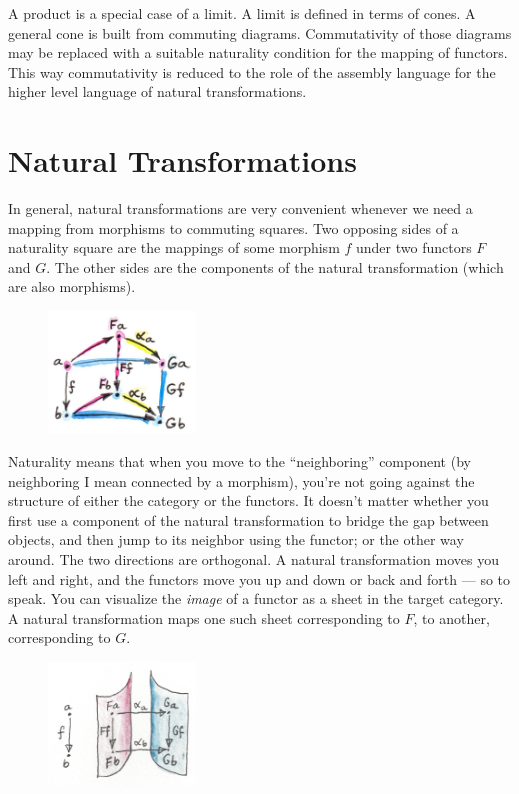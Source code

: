 \noindent
A product is a special case of a limit. A limit is defined in terms of
cones. A general cone is built from commuting diagrams. Commutativity of
those diagrams may be replaced with a suitable naturality condition for
the mapping of functors. This way commutativity is reduced to the role
of the assembly language for the higher level language of natural
transformations.

\section{Natural Transformations}

In general, natural transformations are very convenient whenever we need
a mapping from morphisms to commuting squares. Two opposing sides of a
naturality square are the mappings of some morphism $f$ under two
functors $F$ and $G$. The other sides are the components
of the natural transformation (which are also morphisms).

\begin{figure}[H]
  \centering
  \includegraphics[width=0.35\textwidth]{images/3_naturality.jpg}
\end{figure}

\noindent
Naturality means that when you move to the ``neighboring'' component (by
neighboring I mean connected by a morphism), you're not going against
the structure of either the category or the functors. It doesn't matter
whether you first use a component of the natural transformation to
bridge the gap between objects, and then jump to its neighbor using the
functor; or the other way around. The two directions are orthogonal. A
natural transformation moves you left and right, and the functors move
you up and down or back and forth --- so to speak. You can visualize the
\emph{image} of a functor as a sheet in the target category. A natural
transformation maps one such sheet corresponding to $F$, to another,
corresponding to $G$.

\begin{figure}[H]
  \centering
  \includegraphics[width=0.35\textwidth]{images/sheets.png}
\end{figure}

